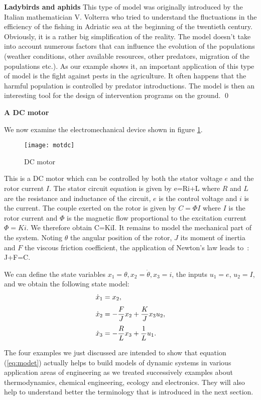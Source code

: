 \begin{exemple}{\bf Ladybirds and aphids}
This type of model was originally introduced by the Italian mathematician V. Volterra who tried to understand the fluctuations in the efficiency of the fishing in Adriatic sea at the beginning of the twentieth century. Obviously, it is a rather big simplification of the reality. The model doesn't take into account numerous factors that can influence the evolution of the populations (weather conditions, other available resources, other predators, migration of the populations etc.). As our example shows it, an important application of this type of model is the fight against pests in the agriculture. It often happens that the harmful population is controlled by predator introductions. The model is then an interesting tool for the design of intervention programs on the ground. \qed \\
\end{exemple}


\begin{exemple}{\bf A DC motor}

We now examine the electromechanical device shown in figure \ref{fig:motdc}.
\begin{figure}[ht]
\begin{center}
\texttt{[image: motdc]}
\caption{DC motor}
\label{fig:motdc}
\end{center}
\end{figure}
This is a DC motor which can be controlled by both the stator voltage $e$ and the rotor current $I$.
The stator circuit equation is given by
\eqnn
e=Ri+L
\eeqnn
where $R$ and $L$ are the resistance and inductance of the circuit,
$e$ is the control voltage and $ i$ is the current. The couple
exerted on the rotor is given by $C = \Phi I$ where $I$ is the rotor current and $\Phi$ is the magnetic flow
proportional to the excitation current $\Phi = Ki$. We therefore obtain
\eqnn
C=KiI.
\eeqnn
It remains to model the mechanical part of the system. Noting $\theta$ the
angular position of the rotor, $J$ its moment of inertia and $F$ the viscous friction coefficient, the application of Newton's law leads to~:
\eqnn
J+F=C.
\eeqnn

We can define the state variables $x_1=\theta, x_2=\dot{\theta}, x_3=i$, the inputs $u_1=e$, $u_2=I$, and we obtain the following state model:
\begin{equation} \begin{split} \label{motDC}
\dot x_1 &= x_2,  \\[0.3em]
\dot x_2 &= -\frac{F}{J}x_2+\frac{K}{J}x_3u_2, \\[0.3em]
\dot x_3 &= -\frac{R}{L}x_3+\frac{1}{L}u_1. \xqedhere{5cm}{\qed}
\end{split} \end{equation}
\end{exemple}
The four examples we just discussed are intended to show
that equation (\ref{eq:modet}) actually helps to build models of dynamic systems in various application areas
of engineering as we treated successively examples about thermodynamics, chemical engineering, ecology and electronics. They will also help to understand better the terminology that is introduced in the next section. 

